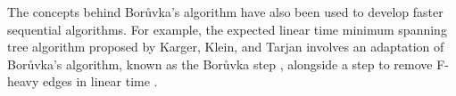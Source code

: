 \documentclass[a4paper, 11pt]{article}
\begin{document}
The concepts behind Borůvka's algorithm have also been used to develop faster sequential algorithms. For example, the expected linear time minimum spanning tree algorithm proposed by Karger, Klein, and Tarjan involves an adaptation of Borůvka's algorithm, known as the Borůvka step \cite{dixon1992verification, king1995simpler}, alongside a step to remove F-heavy edges in linear time \cite{karger1995randomized}.

\newpage


\end{document}
